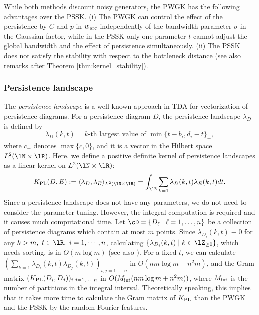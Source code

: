 \documentclass{article}
\providecommand{\inn}[2]{\langle #1, #2 \rangle}
\begin{document}
While both methods discount noisy generators, the PWGK has the following advantages over the PSSK.
(i) The PWGK can control the effect of the persistence by $C$ and $p$ in $w_{{\rm arc}}$ independently of the bandwidth parameter $\sigma$ in the Gaussian factor, while in the PSSK only one parameter $t$ cannot adjust the global bandwidth and the effect of persistence simultaneously.
(ii) The PSSK does not satisfy the stability with respect to the bottleneck distance (see also remarks after Theorem \ref{thm:kernel_stability}).

\subsubsection{Persistence landscape}
\label{subsubsec:pl}
The {\em persistence landscape} \cite{Bu15} is a well-known approach in TDA for vectorization of persistence diagrams.
For a persistence diagram $D$, the persistence landscape $\lambda_{D}$ is defined by
\[
\lambda_{D}(k,t) = k \mbox{-th largest value of } \min \{ t-b_{i},d_{i}-t\}_{+},
\]
where $c_{+}$ denotes $\max \{c,0\}$, and it is a vector in the Hilbert space $L^{2}(\lN \times \lR)$.
Here, we define a positive definite kernel of persistence landscapes as a linear kernel on $L^{2}(\lN \times \lR)$:
\begin{align}
K_{{\rm PL}}(D,E):=\inn{\lambda_{D}}{\lambda_{E}}_{L^{2}(\lN \times \lR)}=\int_{\lR} \sum_{k=1} \lambda_{D}(k,t)\lambda_{E}(k,t) dt. \label{eq:landscape}
\end{align}
Since a persistence landscape does not have any parameters, we do not need to consider the parameter tuning.
However, the integral computation is required and it causes much computational time.
Let $\cD=\{D_{\ell} \mid \ell=1,\ldots,n\}$ be a collection of persistence diagrams which contain at most $m$ points.
Since $\lambda_{D_{i}}(k,t) \equiv 0$ for any $k>m, ~ t \in \lR, ~ i=1,\cdots,n$, calculating $\{\lambda_{D_{i}}(k,t) \mid k \in \lZ_{\geq 0}\}$, which needs sorting, is in $O(m \log m)$ (see also \cite{BD17}).
For a fixed $t$, we can calculate $( \sum_{k=1} \lambda_{D_{i}}(k,t)\lambda_{D_{j}}(k,t) )_{i,j=1,\cdots, n}$ in $O(nm \log m + n^{2}m)$, and the Gram matrix $(K_{{\rm PL}}(D_{i},D_{j}))_{i,j = 1,\cdots,n}$ in $O(M_{{\rm int}} (nm \log m +n^{2}m))$, where $M_{{\rm int}}$ is the number of partitions in the integral interval.
Theoretically speaking, this implies that it takes more time to calculate the Gram matrix of $K_{{\rm PL}}$ than the PWGK and the PSSK by the random Fourier features.
\end{document}
